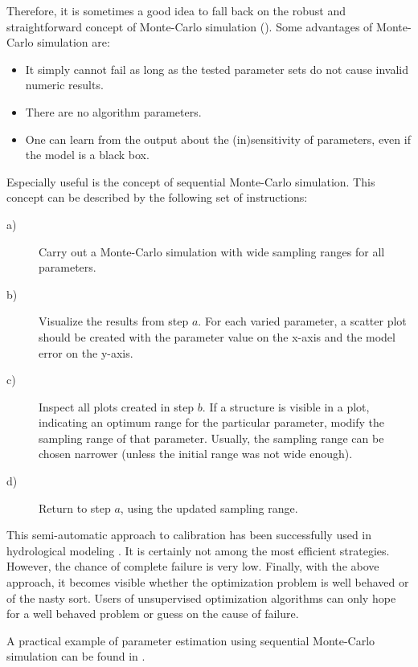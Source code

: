 Therefore, it is sometimes a good idea to fall back on the robust and straightforward concept of Monte-Carlo simulation (). Some advantages of Monte-Carlo simulation are:
\begin{itemize}
  \item It simply cannot fail as long as the tested parameter sets do not cause invalid numeric results.
  \item There are no algorithm parameters.
  \item One can learn from the output about the (in)sensitivity of parameters, even if the model is a black box.
\end{itemize}

Especially useful is the concept of sequential Monte-Carlo simulation. This concept can be described by the following set of instructions:
\begin{description}
  \item[a)] Carry out a Monte-Carlo simulation with wide sampling ranges for all parameters.
  \item[b)] Visualize the results from step $a$. For each varied parameter, a scatter plot should be created with the parameter value on the x-axis and the model error on the y-axis.
  \item[c)] Inspect all plots created in step $b$. If a structure is visible in a plot, indicating an optimum range for the particular parameter, modify the sampling range of that parameter. Usually, the sampling range can be chosen narrower (unless the initial range was not wide enough).
  \item[d)] Return to step $a$, using the updated sampling range.
\end{description}

This semi-automatic approach to calibration has been successfully used in hydrological modeling \citep[see, \eg{}][]{Kneis2012}. It is certainly not among the most efficient strategies. However, the chance of complete failure is very low. Finally, with the above approach, it becomes visible whether the optimization problem is well behaved or of the nasty sort. Users of unsupervised optimization algorithms can only hope for a well behaved problem or guess on the cause of failure.

A practical example of parameter estimation using sequential Monte-Carlo simulation can be found in .


